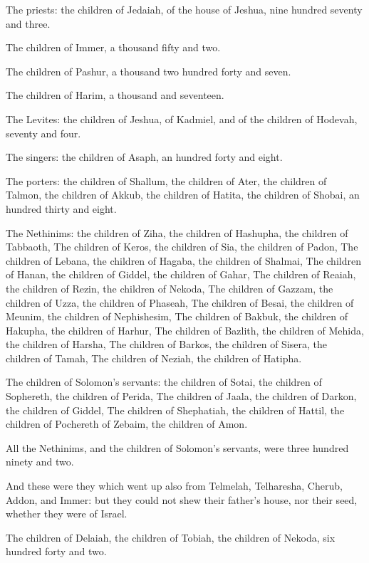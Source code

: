 \verse The priests: the children of Jedaiah, of the house of Jeshua, nine hundred seventy and three.

\verse The children of Immer, a thousand fifty and two.

\verse The children of Pashur, a thousand two hundred forty and seven.

\verse The children of Harim, a thousand and seventeen.

\verse The Levites: the children of Jeshua, of Kadmiel, and of the children of Hodevah, seventy and four.

\verse The singers: the children of Asaph, an hundred forty and eight.

\verse The porters: the children of Shallum, the children of Ater, the children of Talmon, the children of Akkub, the children of Hatita, the children of Shobai, an hundred thirty and eight.

\verse The Nethinims: the children of Ziha, the children of Hashupha, the children of Tabbaoth, \verse The children of Keros, the children of Sia, the children of Padon, \verse The children of Lebana, the children of Hagaba, the children of Shalmai, \verse The children of Hanan, the children of Giddel, the children of Gahar, \verse The children of Reaiah, the children of Rezin, the children of Nekoda, \verse The children of Gazzam, the children of Uzza, the children of Phaseah, \verse The children of Besai, the children of Meunim, the children of Nephishesim, \verse The children of Bakbuk, the children of Hakupha, the children of Harhur, \verse The children of Bazlith, the children of Mehida, the children of Harsha, \verse The children of Barkos, the children of Sisera, the children of Tamah, \verse The children of Neziah, the children of Hatipha.

\verse The children of Solomon's servants: the children of Sotai, the children of Sophereth, the children of Perida, \verse The children of Jaala, the children of Darkon, the children of Giddel, \verse The children of Shephatiah, the children of Hattil, the children of Pochereth of Zebaim, the children of Amon.

\verse All the Nethinims, and the children of Solomon's servants, were three hundred ninety and two.

\verse And these were they which went up also from Telmelah, Telharesha, Cherub, Addon, and Immer: but they could not shew their father's house, nor their seed, whether they were of Israel.

\verse The children of Delaiah, the children of Tobiah, the children of Nekoda, six hundred forty and two.

